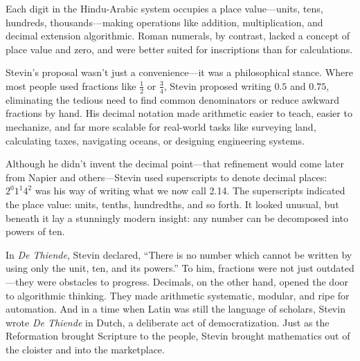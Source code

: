 Each digit in the Hindu-Arabic system occupies a place value—units, tens, hundreds, thousands—making operations like addition, multiplication, and decimal extension algorithmic. Roman numerals, by contrast, lacked a concept of place value and zero, and were better suited for inscriptions than for calculations.

Stevin’s proposal wasn’t just a convenience—it was a philosophical stance. Where most people used fractions like \( \frac{1}{2} \) or \( \frac{3}{4} \), Stevin proposed writing \( 0.5 \) and \( 0.75 \), eliminating the tedious need to find common denominators or reduce awkward fractions by hand. His decimal notation made arithmetic easier to teach, easier to mechanize, and far more scalable for real-world tasks like surveying land, calculating taxes, navigating oceans, or designing engineering systems.

Although he didn’t invent the decimal point—that refinement would come later from Napier and others—Stevin used superscripts to denote decimal places: \( 2^{0}1^{1}4^{2} \) was his way of writing what we now call 2.14. The superscripts indicated the place value: units, tenths, hundredths, and so forth. It looked unusual, but beneath it lay a stunningly modern insight: any number can be decomposed into powers of ten.

In \textit{De Thiende}, Stevin declared, ``There is no number which cannot be written by using only the unit, ten, and its powers.'' To him, fractions were not just outdated—they were obstacles to progress. Decimals, on the other hand, opened the door to algorithmic thinking. They made arithmetic systematic, modular, and ripe for automation. And in a time when Latin was still the language of scholars, Stevin wrote \textit{De Thiende} in Dutch, a deliberate act of democratization. Just as the Reformation brought Scripture to the people, Stevin brought mathematics out of the cloister and into the marketplace.



